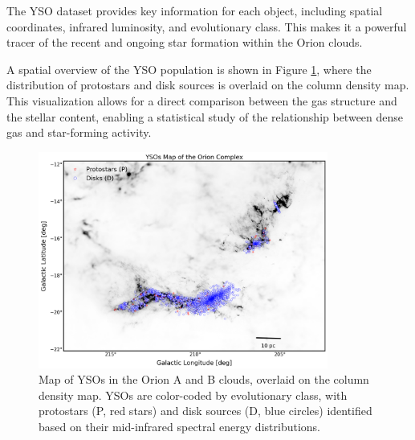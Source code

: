 The YSO dataset provides key information for each object, including spatial coordinates, infrared luminosity, and evolutionary class. This makes it a powerful tracer of the recent and ongoing star formation within the Orion clouds.

A spatial overview of the YSO population is shown in Figure \ref{fig:YSO_map}, where the distribution of protostars and disk sources is overlaid on the column density map. This visualization allows for a direct comparison between the gas structure and the stellar content, enabling a statistical study of the relationship between dense gas and star-forming activity.

\begin{figure}[t]
    \centering
    \includegraphics[width=0.85\textwidth]{figures/YSOs_orion.png}
    \caption{Map of YSOs in the Orion A and B clouds, overlaid on the column density map. YSOs are color-coded by evolutionary class, with protostars (P, red stars) and disk sources (D, blue circles) identified based on their mid-infrared spectral energy distributions.}
    \label{fig:YSO_map}
\end{figure}